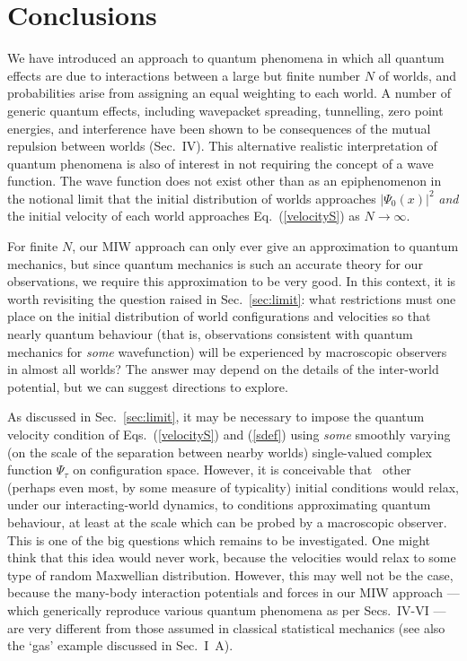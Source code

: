 \documentclass[twocolumn,aps,pra,amsmath,amssymb,superscriptaddress]{revtex4}
\renewcommand{\(}{\left(}
\renewcommand{\)}{\right)}
\newcommand{\red}{\color{red}}
\newcommand{\blk}{\color{black}}
\newcommand{\blu}{\color{blue}}
\renewcommand\blu{\blk}
\renewcommand\red{\blk}
\begin{document}
\section{Conclusions}

We have introduced an approach to quantum phenomena in which all quantum effects
are due to interactions between a large but finite number $N$ \blk of worlds, and
probabilities arise from assigning an equal weighting to each world.  A number
of generic quantum effects, including  wavepacket  spreading,  
tunnelling, zero
point energies, and interference \blk have been shown to be consequences of the mutual repulsion
between worlds   \blk (Sec.~IV).  This
alternative realistic interpretation of quantum phenomena is also of interest in
not requiring the concept of a wave function. 
The \blk wave function does not
exist other than as an epiphenomenon  in the notional limit 
that the initial distribution of worlds approaches $|\Psi_0(x)|^2$ 
{\it and} the initial velocity of each world approaches Eq.~(\ref{velocityS}) as $N\to\infty$.

 For finite $N$, our MIW approach can only ever give an approximation to 
quantum mechanics, but since quantum mechanics
is such an accurate theory for our observations, we require this approximation to 
be very good. \red In this context, it is worth   revisiting the question 
raised in Sec.~\ref{sec:limit}: \blk 
what restrictions must one place on the initial distribution of world configurations 
and velocities so that nearly quantum behaviour (that is, observations consistent with 
quantum mechanics for {\em some} wavefunction) 
will  be experienced by macroscopic observers in almost all worlds?    
The answer may depend on the details of the inter-world potential, 
\red but we can suggest directions to explore.

\red As discussed in Sec.~\ref{sec:limit}, it \blk may be necessary 
to impose the quantum velocity condition of Eqs.~(\ref{velocityS}) and (\ref{sdef}) \blk using {\em some} smoothly 
varying (on the scale of the separation between nearby worlds) 
single-valued complex function \red $\Psi_\tau$ \blk on configuration space.
\red However, \blk it is conceivable that \ other (perhaps even most, by some measure 
of typicality)  initial conditions would relax, under our 
interacting-world dynamics, to conditions approximating quantum behaviour, 
at least at the scale which can be probed by a macroscopic observer. 
This is one of the big questions which remains to be investigated. \red One might 
think that this idea would never work, because the velocities 
would relax to \blu some type of random Maxwellian distribution. \red 
 However, this may well not be the case, because \blu 
 the many-body interaction potentials and forces in our MIW approach 
--- which generically reproduce various quantum phenomena as per Secs.~IV-VI \red --- are very 
different from those assumed in classical statistical mechanics \blu (see also the `gas' example discussed in Sec.~I~A).   \blk
\end{document}
